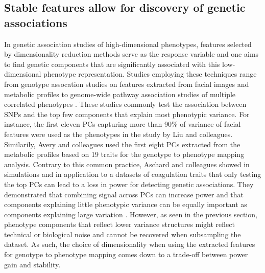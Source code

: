 \subsection{Stable features allow for discovery of genetic associations}
\label{subsection:association-DimRed}
In genetic association studies of high-dimensional phenotypes, features selected by dimensionality reduction methods serve as the response variable and one aims to find genetic components that are significantly associated with this low-dimensional phenotype representation. Studies employing these techniques range from genotype assocation studies on features extracted from facial images \citep{Liu2012} and metabolic profiles \citep{Avery2011} to genome-wide pathway association studies of multiple correlated phenotypes \citep{Zhang2012}. These studies commonly test the association between SNPs and the top few components that explain most phenotypic variance. For instance,  the first eleven PCs capturing more than \num{90}\% of variance of facial features were used as the phenotypes in the study by Liu and colleagues. Similarily, Avery and colleagues used the first eight PCs extracted from the metabolic profiles based on \num{19} traits for the genotype to phenotype mapping analysis. Contrary to this common practice, Aschard and colleagues showed in simulations and in application to a datasets of coagulation traits that only testing the top PCs can lead to a loss in power for detecting genetic associations. They demonstrated that combining signal across PCs can increase power and that components explaining little phenotypic variance can be equally important as components explaining large variation \citep{Aschard2104}. However, as seen in the previous section, phenotype components that reflect lower variance structures might reflect technical or biological noise and cannot be recovered when subsampling the dataset. As such, the choice of dimensionality when using the extracted features for genotype to phenotype mapping comes down to a trade-off between power gain and stability.


